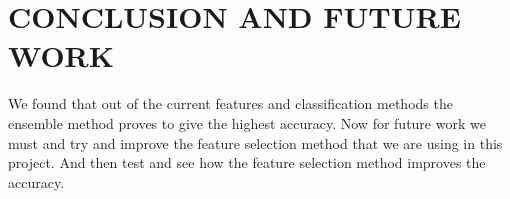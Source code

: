 \chapter{\uppercase{Conclusion and Future Work}}
\label{chap:conclusion}
We found that out of the current features and classification methods the ensemble method proves to give the highest accuracy. Now for future work we must and try and improve the feature selection method that we are using in this project. And then test and see how the feature selection method improves the accuracy.